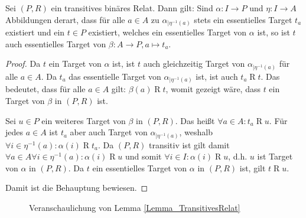\documentclass{article}
\begin{document}
\begin{lemma}\label{Lemma_TransitivesRelat}
  Sei $(P, R)$ ein transitives binäres Relat. Dann gilt:
  Sind $\alpha \colon I \to P$ und $\eta \colon I \to A$ Abbildungen derart, 
  dass für alle $a \in A$ zu $\alpha_{\mid \eta^{-1}(a)}$ stets ein essentielles Target $t_a$ existiert
  und ein $t \in P$ existiert, welches ein essentielles Target von $\alpha$ ist,
  so ist $t$ auch essentielles Target von $\beta \colon A \to P, a \mapsto t_a$.
\end{lemma}
\begin{proof}
  Da $t$ ein Target von $\alpha$ ist,
  ist $t$ auch gleichzeitig Target von $\alpha_{\mid \eta^{-1}(a)}$
  für alle $a \in A$.
  Da $t_a$ das essentielle Target von $\alpha_{\mid \eta^{-1}(a)}$ ist, ist auch $t_a \mathrel{R} t$.
  Das bedeutet, dass für alle $a \in A$ gilt: $\beta(a) \mathrel{R} t$, womit gezeigt wäre, 
  dass $t$ ein Target von $\beta$ in $(P, R)$ ist.

  Sei $u \in P$ ein weiteres Target von $\beta$ in $(P, R)$.
  Das heißt $\forall a \in A \colon t_a \mathrel{R} u$.
  Für jedes $a \in A$ ist $t_a$ aber auch Target von $\alpha_{\mid \eta^{-1}(a)}$,
  weshalb $\forall i \in \eta^{-1}(a) \colon \alpha(i) \mathrel{R} t_a$.
  Da $(P, R)$ transitiv ist gilt damit $\forall a \in A \forall i \in \eta^{-1}(a) \colon \alpha(i) \mathrel{R} u$
  und somit $\forall i \in I \colon \alpha(i) \mathrel{R} u$, d.h. $u$ ist Target von $\alpha$ in $(P, R)$.
  Da $t$ ein essentielles Target von $\alpha$ in $(P, R)$ ist, gilt $t \mathrel{R} u$.

  Damit ist die Behauptung bewiesen.
\end{proof}

\begin{figure}
  \caption{Veranschaulichung von Lemma \ref{Lemma_TransitivesRelat}}
  \label{fig:TransitivesRelat}
\end{figure}
\end{document}
